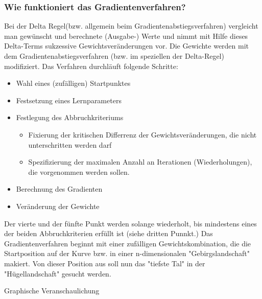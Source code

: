 \subsubsection{Wie funktioniert das Gradientenverfahren?}\label{subsec:gradientenverfahren:wie_funktioniert}
  Bei der Delta Regel(bzw. allgemein beim Gradientenabstiegsverfahren) vergleicht man gewünscht und berechnete (Ausgabe-) Werte und nimmt mit Hilfe dieses Delta-Terms sukzessive
  Gewichtsveränderungen vor.
  Die Gewichte werden mit dem Gradientenabstiegsverfahren (bzw. im speziellen der Delta-Regel) modifiziert.
  Das Verfahren durchläuft folgende Schritte:
  \begin{itemize}
    \item Wahl eines (zufälligen) Startpunktes
  \end{itemize}
  \begin{itemize}
    \item Festsetzung eines Lernparameters
  \end{itemize}
  \begin{itemize}
    \item Festlegung des Abbruchkriteriums
    \begin{itemize}
    \item Fixierung der kritischen Differrenz der Gewichtsveränderungen, die nicht unterschritten werden darf
    \item Spezifizierung der maximalen Anzahl an Iterationen (Wiederholungen), die vorgenommen werden sollen.
    \end{itemize}
  \end{itemize}
  \begin{itemize}
    \item  Berechnung des Gradienten
  \end{itemize}
  \begin{itemize}
    \item Veränderung der Gewichte
  \end{itemize}

  Der vierte und der fünfte Punkt werden solange wiederholt, bis mindestens eines der beiden Abbruchkriterien erfüllt ist (siehe dritten Punnkt.)
  Das Gradientenverfahren beginnt mit einer zufälligen Gewichtskombination, die die Startposition auf der Kurve bzw. in einer n-dimensionalen "Gebirgslandschaft" makiert.
  Von dieser Position aus soll nun das "tiefste Tal" in der "Hügellandschaft" gesucht werden.\cite{GR10}
  


  Graphische Veranschaulichung 
